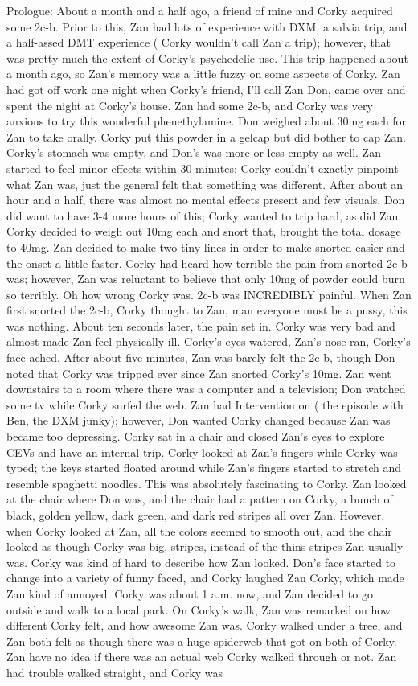 \documentclass[12pt]{book}
\begin{document}
Prologue: About a month and a half ago, a friend of mine and Corky acquired some 2c-b. Prior to this, Zan had lots of experience with DXM, a salvia trip, and a half-assed DMT experience ( Corky wouldn't call Zan a trip); however, that was pretty much the extent of Corky's psychedelic use. This trip happened about a month ago, so Zan's memory was a little fuzzy on some aspects of Corky. Zan had got off work one night when Corky's friend, I'll call Zan Don, came over and spent the night at Corky's house. Zan had some 2c-b, and Corky was very anxious to try this wonderful phenethylamine. Don weighed about 30mg each for Zan to take orally. Corky put this powder in a gelcap but did bother to cap Zan. Corky's stomach was empty, and Don's was more or less empty as well. Zan started to feel minor effects within 30 minutes; Corky couldn't exactly pinpoint what Zan was, just the general felt that something was different. After about an hour and a half, there was almost no mental effects present and few visuals. Don did want to have 3-4 more hours of this; Corky wanted to trip hard, as did Zan. Corky decided to weigh out 10mg each and snort that, brought the total dosage to 40mg. Zan decided to make two tiny lines in order to make snorted easier and the onset a little faster. Corky had heard how terrible the pain from snorted 2c-b was; however, Zan was reluctant to believe that only 10mg of powder could burn so terribly. Oh how wrong Corky was. 2c-b was INCREDIBLY painful. When Zan first snorted the 2c-b, Corky thought to Zan, man everyone must be a pussy, this was nothing. About ten seconds later, the pain set in. Corky was very bad and almost made Zan feel physically ill. Corky's eyes watered, Zan's nose ran, Corky's face ached. After about five minutes, Zan was barely felt the 2c-b, though Don noted that Corky was tripped ever since Zan snorted Corky's 10mg. Zan went downstairs to a room where there was a computer and a television; Don watched some tv while Corky surfed the web. Zan had Intervention on ( the episode with Ben, the DXM junky); however, Don wanted Corky changed because Zan was became too depressing. Corky sat in a chair and closed Zan's eyes to explore CEVs and have an internal trip. Corky looked at Zan's fingers while Corky was typed; the keys started floated around while Zan's fingers started to stretch and resemble spaghetti noodles. This was absolutely fascinating to Corky. Zan looked at the chair where Don was, and the chair had a pattern on Corky, a bunch of black, golden yellow, dark green, and dark red stripes all over Zan. However, when Corky looked at Zan, all the colors seemed to smooth out, and the chair looked as though Corky was big, stripes, instead of the thins stripes Zan usually was. Corky was kind of hard to describe how Zan looked. Don's face started to change into a variety of funny faced, and Corky laughed Zan Corky, which made Zan kind of annoyed. Corky was about 1 a.m. now, and Zan decided to go outside and walk to a local park. On Corky's walk, Zan was remarked on how different Corky felt, and how awesome Zan was. Corky walked under a tree, and Zan both felt as though there was a huge spiderweb that got on both of Corky. Zan have no idea if there was an actual web Corky walked through or not. Zan had trouble walked straight, and Corky was 
\end{document}
